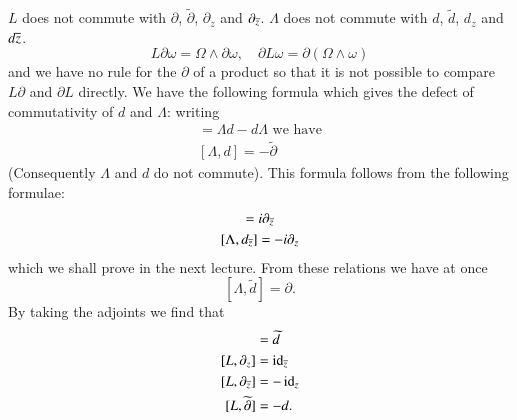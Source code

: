 $L$ does not commute with $\partial$, $\widetilde{\partial}$,
$\partial_{z}$ and $\partial_{\overline{z}}$. $\Lambda$ does not commute
with $d$, $\widetilde{d}$, $d_{z}$ and $d\overline{z}$.
$$
L\partial\omega=\Omega\wedge\partial\omega,\quad \partial
L\omega=\partial(\Omega\wedge\omega)
$$
and we have no rule for the $\partial$ of a product so that it is not
possible to compare $L\partial$ and $\partial L$ directly. We have the
following formula which gives the defect of commutativity of $d$ and
$\Lambda$: writing
\begin{gather*}
[\Lambda,d]=\Lambda d-d\Lambda\text{ \  we have}\\
[\Lambda, d]=-\widetilde{\partial}
\end{gather*}
(Consequently $\Lambda$ and $d$ do not commute). This formula follows
from the following formulae:
\begin{gather*}
[\Lambda,d_{z}]=i\partial_{\ob{z}}\\
[\Lambda,d_{\ob{z}}]=-i\partial_{z}
\end{gather*}
which we shall prove in the next lecture. From these relations we have
at once 
$$
[\Lambda,\widetilde{d}]=\partial.
$$\pageoriginale
By taking the adjoints we find that
\begin{align*}
[L,\partial] &= \widetilde{d}\\ 
[L,\partial_{z}] &= \id_{\ob{z}}\\ 
[L,\partial_{\ob{z}}] &= -\id_{z}\\
[L,\widetilde{\partial}] &= -d.
\end{align*}

